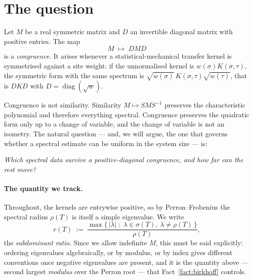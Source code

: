 \documentclass[11pt,a4paper]{article}
\theoremstyle{plain}
\theoremstyle{definition}
\newcommand{\diag}{\operatorname{diag}}
\begin{document}
\begin{abstract}
congruence invariant, and Birkhoff's contraction theorem converts it into the
bound --- and it uses no definiteness at all, only positivity of the entries.
The hypercube instance is the fusion bound. Every new algebraic lemma is
machine-checked in Lean~4, and the supremum theorem exists in the kernel in
\emph{conditional} form, with its one remaining \emph{non-elementary} input ---
the Birkhoff spectral bound --- carried as an explicit hypothesis rather than an
axiom. The lower bound uses no limiting argument about spectra: a two-supported
fluctuation vector gives the estimate at each strictly positive $\varepsilon$
separately, after which only scalar arithmetic remains, so no continuity of
eigenvalues is imported anywhere.
\end{abstract}

\section{The question}

Let $M$ be a real symmetric matrix and $D$ an invertible diagonal matrix with
positive entries. The map
\[
  M \;\longmapsto\; DMD
\]
is a \emph{congruence}. It arises whenever a statistical-mechanical transfer
kernel is symmetrised against a site weight: if the unnormalised kernel is
$w(\sigma)K(\sigma,\tau)$, the symmetric form with the same spectrum is
$\sqrt{w(\sigma)}\,K(\sigma,\tau)\sqrt{w(\tau)}$, that is $DKD$ with
$D=\diag(\sqrt{w})$.

Congruence is not similarity. Similarity $M \mapsto S M S^{-1}$ preserves the
characteristic polynomial and therefore everything spectral. Congruence
preserves the quadratic form only up to a change of variable, and the change of
variable is not an isometry. The natural question --- and, we will argue, the
one that governs whether a spectral estimate can be uniform in the system size
--- is:

\begin{center}
\emph{Which spectral data survive a positive-diagonal congruence, and how far
can the rest move?}
\end{center}

\paragraph{The quantity we track.} Throughout, the kernels are entrywise
positive, so by Perron--Frobenius the spectral radius $\rho(T)$ is itself a
simple eigenvalue. We write
\[
  r(T)\;:=\;\frac{\max\{\,|\lambda| \;:\; \lambda\in\sigma(T),\ \lambda\neq\rho(T)\,\}}
                 {\rho(T)} ,
\]
the \emph{subdominant ratio}. Since we allow indefinite $M$, this must be said
explicitly: ordering eigenvalues algebraically, or by modulus, or by index gives
different conventions once negative eigenvalues are present, and it is the
quantity above --- second largest \emph{modulus} over the Perron root --- that
Fact~\ref{fact:birkhoff} controls.
\end{document}
